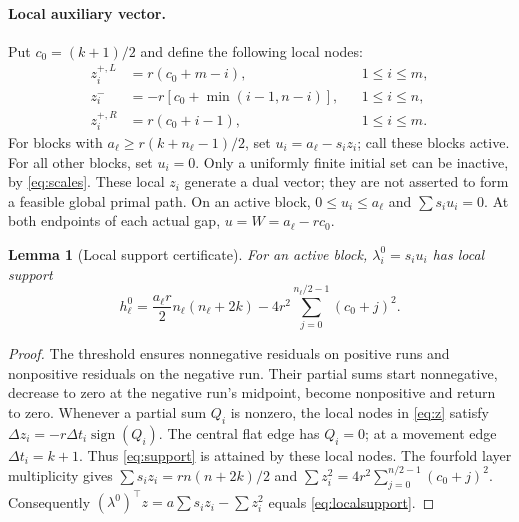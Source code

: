 \documentclass[11pt]{article}
\newtheorem{lemma}{Lemma}
\begin{document}
\paragraph{Local auxiliary vector.}
Put $c_0=(k+1)/2$ and define the following local nodes:
\begin{align}\label{eq:z}
 z_i^{+,L}&=r(c_0+m-i),&&1\le i\le m,\nonumber\\
 z_i^-&=-r[c_0+\min(i-1,n-i)],&&1\le i\le n,\\
 z_i^{+,R}&=r(c_0+i-1),&&1\le i\le m.\nonumber
\end{align}
For blocks with $a_\ell\ge r(k+n_\ell-1)/2$, set
$u_i=a_\ell-s_i z_i$; call these blocks active.
For all other blocks, set $u_i=0$. Only a uniformly finite initial set can
be inactive, by \eqref{eq:scales}. These local $z_i$ generate a dual vector;
they are not asserted to form a feasible global primal path.
On an active block, $0\le u_i\le a_\ell$ and $\sum s_i u_i=0$.
At both endpoints of each actual gap, $u=W=a_\ell-rc_0$.

\begin{lemma}[Local support certificate]\label{lem:local}
For an active block, $\lambda_i^0=s_i u_i$ has local support
\begin{equation}\label{eq:localsupport}
 h_\ell^0=\frac{a_\ell r}{2}n_\ell(n_\ell+2k)
 -4r^2\sum_{j=0}^{n_\ell/2-1}(c_0+j)^2.
\end{equation}
\end{lemma}
\begin{proof}
The threshold ensures nonnegative residuals on positive runs and nonpositive
residuals on the negative run. Their partial sums start nonnegative, decrease
to zero at the negative run's midpoint, become nonpositive and return to zero.
Whenever a partial sum $Q_i$ is nonzero, the local nodes in \eqref{eq:z}
satisfy $\Delta z_i=-r\Delta t_i\operatorname{sign}(Q_i)$.
The central flat edge has $Q_i=0$; at a movement edge $\Delta t_i=k+1$.
Thus \eqref{eq:support} is attained by these local nodes.
The fourfold layer multiplicity gives
$\sum s_i z_i=r n(n+2k)/2$ and
$\sum z_i^2=4r^2\sum_{j=0}^{n/2-1}(c_0+j)^2$.
Consequently $(\lambda^0)^\top z=a\sum s_i z_i-\sum z_i^2$
equals \eqref{eq:localsupport}.
\end{proof}
\end{document}
